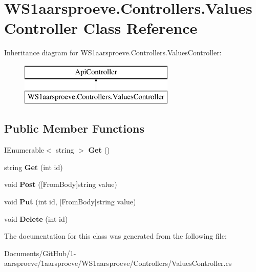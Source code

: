 \hypertarget{class_w_s1aarsproeve_1_1_controllers_1_1_values_controller}{}\section{W\+S1aarsproeve.\+Controllers.\+Values\+Controller Class Reference}
\label{class_w_s1aarsproeve_1_1_controllers_1_1_values_controller}
Inheritance diagram for W\+S1aarsproeve.\+Controllers.\+Values\+Controller\+:\begin{figure}[H]
\begin{center}
\leavevmode
\includegraphics[height=2.000000cm]{class_w_s1aarsproeve_1_1_controllers_1_1_values_controller}
\end{center}
\end{figure}
\subsection*{Public Member Functions}
\begin{DoxyCompactItemize}
\item 
\hypertarget{class_w_s1aarsproeve_1_1_controllers_1_1_values_controller_a32954e5dd89826785b404a6b4acd3a78}{}I\+Enumerable$<$ string $>$ {\bfseries Get} ()\label{class_w_s1aarsproeve_1_1_controllers_1_1_values_controller_a32954e5dd89826785b404a6b4acd3a78}

\item 
\hypertarget{class_w_s1aarsproeve_1_1_controllers_1_1_values_controller_a8fb5bc2f538392642db0d1bd8791a903}{}string {\bfseries Get} (int id)\label{class_w_s1aarsproeve_1_1_controllers_1_1_values_controller_a8fb5bc2f538392642db0d1bd8791a903}

\item 
\hypertarget{class_w_s1aarsproeve_1_1_controllers_1_1_values_controller_a3c58b731329271e8b9bcde72657d4271}{}void {\bfseries Post} (\mbox{[}From\+Body\mbox{]}string value)\label{class_w_s1aarsproeve_1_1_controllers_1_1_values_controller_a3c58b731329271e8b9bcde72657d4271}

\item 
\hypertarget{class_w_s1aarsproeve_1_1_controllers_1_1_values_controller_aa75f3530190e54fd075a709ad4f42023}{}void {\bfseries Put} (int id, \mbox{[}From\+Body\mbox{]}string value)\label{class_w_s1aarsproeve_1_1_controllers_1_1_values_controller_aa75f3530190e54fd075a709ad4f42023}

\item 
\hypertarget{class_w_s1aarsproeve_1_1_controllers_1_1_values_controller_ab9b4096dc55ce695628df46fa6f7bb67}{}void {\bfseries Delete} (int id)\label{class_w_s1aarsproeve_1_1_controllers_1_1_values_controller_ab9b4096dc55ce695628df46fa6f7bb67}

\end{DoxyCompactItemize}


The documentation for this class was generated from the following file\+:\begin{DoxyCompactItemize}
\item 
Documents/\+Git\+Hub/1-\/aarsproeve/1aarsproeve/\+W\+S1aarsproeve/\+Controllers/Values\+Controller.\+cs\end{DoxyCompactItemize}
